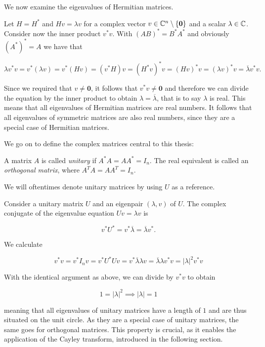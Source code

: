 We now examine the eigenvalues of Hermitian matrices.

Let $H = H^*$ and $H v = \lambda v$ for a complex vector $v \in \mathbb{C}^n \setminus \{\mathbf{0}\}$ and a scalar $\lambda \in \mathbb{C}$. Consider now the inner product $ v^* v$. With $(A B)^* = B^* A^*$ and obviously ${(A^*)^*} = A$ we have that

\[
    \lambda v^* v = v^* \left( \lambda v \right)
    = v^* \left( H v \right)
    = \left(v^* H \right) v
    = \left( H^* v \right)^* v
    = \left( H v \right)^* v
    = (\lambda v)^* v
    = \overline{\lambda} v^* v.
\]

Since we required that $v \neq \mathbf{0}$, it follows that $v^* v \neq \mathbf{0}$ and therefore we can divide the equation by the inner product to obtain $\lambda = \overline{\lambda}$, that is to say $\lambda$ is real. This means that all eigenvalues of Hermitian matrices are real numbers. It follows that all eigenvalues of symmetric matrices are also real numbers, since they are a special case of Hermitian matrices.

We go on to define the complex matrices central to this thesis:

\begin{definition}
    A matrix $A$ is called \emph{unitary} if $A^* A = A A^* = I_n$. The real equivalent is called an \emph{orthogonal matrix}, where $A^T A = A A^T = I_n$.
\end{definition}

We will oftentimes denote unitary matrices by using $U$ as a reference. 

Consider a unitary matrix $U$ and an eigenpair $(\lambda, v)$ of $U$. The complex conjugate of the eigenvalue equation $U v = \lambda v$ is

\[
    v^* U^* = v^* \overline{\lambda} = \overline{\lambda} v^*.
\]

We calculate

\[
    v^* v = v^* I_n v = v^* U^* U v = v^* \overline{\lambda} \lambda v = \overline{\lambda} \lambda v^* v = \left| \lambda \right|^2 v^* v
\]

With the identical argument as above, we can divide by $v^* v$ to obtain

\[
    1 = \left| \lambda \right|^2 \implies \left| \lambda \right| = 1
\]

meaning that all eigenvalues of unitary matrices have a length of $1$ and are thus situated on the unit circle. As they are a special case of unitary matrices, the same goes for orthogonal matrices. This property is crucial, as it enables the application of the Cayley transform, introduced in the following section.

